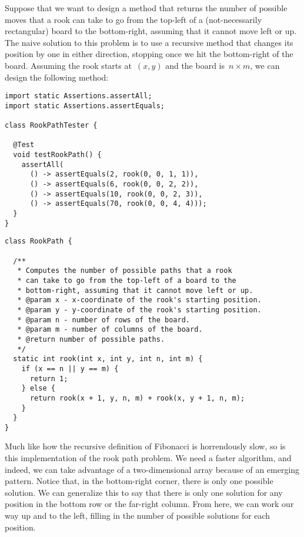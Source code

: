 \enlargethispage{2\baselineskip}
Suppose that we want to design a method that returns the number of possible moves that a rook can take to go from the top-left of a (not-necessarily rectangular) board to the bottom-right, assuming that it cannot move left or up. 
The naive solution to this problem is to use a recursive method that changes its position by one in either direction, stopping once we hit the bottom-right of the board. 
Assuming the rook starts at~$(x, y)$ and the board is~$n \times m$, we can design the following method:

\begin{lstlisting}[language=MyJava]
import static Assertions.assertAll;
import static Assertions.assertEquals;

class RookPathTester {

  @Test
  void testRookPath() {
    assertAll(
      () -> assertEquals(2, rook(0, 0, 1, 1)),
      () -> assertEquals(6, rook(0, 0, 2, 2)),
      () -> assertEquals(10, rook(0, 0, 2, 3)),
      () -> assertEquals(70, rook(0, 0, 4, 4)));
  }
}
\end{lstlisting}

\begin{lstlisting}[language=MyJava]
class RookPath {

  /**
   * Computes the number of possible paths that a rook 
   * can take to go from the top-left of a board to the 
   * bottom-right, assuming that it cannot move left or up.
   * @param x - x-coordinate of the rook's starting position.
   * @param y - y-coordinate of the rook's starting position.
   * @param n - number of rows of the board.
   * @param m - number of columns of the board.
   * @return number of possible paths.
   */
  static int rook(int x, int y, int n, int m) {
    if (x == n || y == m) { 
      return 1; 
    } else { 
      return rook(x + 1, y, n, m) + rook(x, y + 1, n, m); 
    }
  }
}
\end{lstlisting}

Much like how the recursive definition of Fibonacci is horrendously slow, so is this implementation of the rook path problem. 
We need a faster algorithm, and indeed, we can take advantage of a two-dimensional array because of an emerging pattern. 
Notice that, in the bottom-right corner, there is only one possible solution. 
We can generalize this to say that there is only one solution for any position in the bottom row or the far-right column. 
From here, we can work our way up and to the left, filling in the number of possible solutions for each position. 

